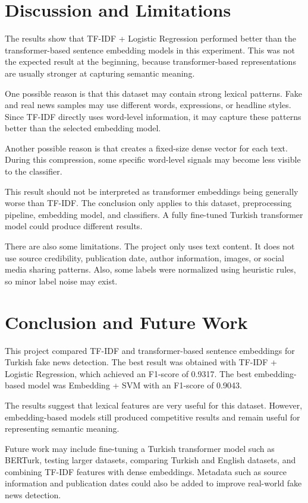 \documentclass[11pt]{article}
\begin{document}
\section{Discussion and Limitations}

The results show that TF-IDF + Logistic Regression performed better than the transformer-based sentence embedding models in this experiment. This was not the expected result at the beginning, because transformer-based representations are usually stronger at capturing semantic meaning.

One possible reason is that this dataset may contain strong lexical patterns. Fake and real news samples may use different words, expressions, or headline styles. Since TF-IDF directly uses word-level information, it may capture these patterns better than the selected embedding model.

Another possible reason is that  creates a fixed-size dense vector for each text. During this compression, some specific word-level signals may become less visible to the classifier.

This result should not be interpreted as transformer embeddings being generally worse than TF-IDF. The conclusion only applies to this dataset, preprocessing pipeline, embedding model, and classifiers. A fully fine-tuned Turkish transformer model could produce different results.

There are also some limitations. The project only uses text content. It does not use source credibility, publication date, author information, images, or social media sharing patterns. Also, some labels were normalized using heuristic rules, so minor label noise may exist.

\section{Conclusion and Future Work}

This project compared TF-IDF and transformer-based sentence embeddings for Turkish fake news detection. The best result was obtained with TF-IDF + Logistic Regression, which achieved an F1-score of 0.9317. The best embedding-based model was Embedding + SVM with an F1-score of 0.9043.

The results suggest that lexical features are very useful for this dataset. However, embedding-based models still produced competitive results and remain useful for representing semantic meaning.

Future work may include fine-tuning a Turkish transformer model such as BERTurk, testing larger datasets, comparing Turkish and English datasets, and combining TF-IDF features with dense embeddings. Metadata such as source information and publication dates could also be added to improve real-world fake news detection.
\end{document}
